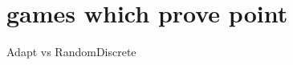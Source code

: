 \documentclass[]{article}
\begin{document}
\section{games which prove point}
	Adapt vs RandomDiscrete\\

	
\end{document}
